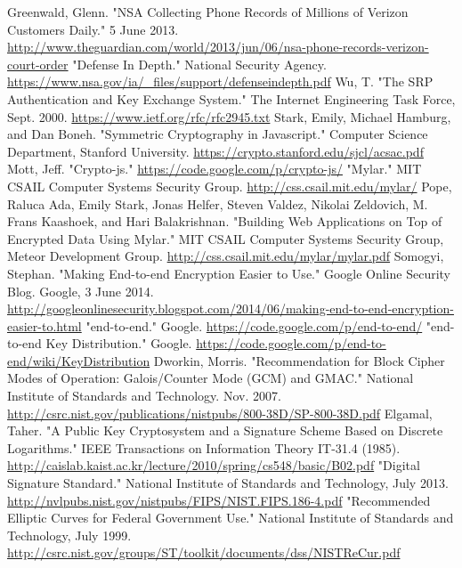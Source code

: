 \documentclass[conference]{IEEEtran}
\begin{document}
\newpage
\begin{thebibliography}{14}
 Greenwald, Glenn. "NSA Collecting Phone Records of Millions of Verizon Customers Daily." 5 June 2013. \url{http://www.theguardian.com/world/2013/jun/06/nsa-phone-records-verizon-court-order}
 "Defense In Depth." National Security Agency. \url{https://www.nsa.gov/ia/_files/support/defenseindepth.pdf}
 Wu, T. "The SRP Authentication and Key Exchange System." The Internet Engineering Task Force, Sept. 2000. \url{https://www.ietf.org/rfc/rfc2945.txt}
 Stark, Emily, Michael Hamburg, and Dan Boneh. "Symmetric Cryptography in Javascript." Computer Science Department, Stanford University. \url{https://crypto.stanford.edu/sjcl/acsac.pdf}
 Mott, Jeff. "Crypto-js." \url{https://code.google.com/p/crypto-js/}
 "Mylar." MIT CSAIL Computer Systems Security Group. \url{http://css.csail.mit.edu/mylar/}
 Pope, Raluca Ada, Emily Stark, Jonas Helfer, Steven Valdez, Nikolai Zeldovich, M. Frans Kaashoek, and Hari Balakrishnan. "Building Web Applications on Top of Encrypted Data Using Mylar." MIT CSAIL Computer Systems Security Group, Meteor Development Group. \url{http://css.csail.mit.edu/mylar/mylar.pdf}
 Somogyi, Stephan. "Making End-to-end Encryption Easier to Use." Google Online Security Blog. Google, 3 June 2014. \url{http://googleonlinesecurity.blogspot.com/2014/06/making-end-to-end-encryption-easier-to.html}
 "end-to-end." Google. \url{https://code.google.com/p/end-to-end/}
 "end-to-end Key Distribution." Google. \url{https://code.google.com/p/end-to-end/wiki/KeyDistribution}
 Dworkin, Morris. "Recommendation for Block Cipher Modes of Operation: Galois/Counter Mode (GCM) and GMAC." National Institute of Standards and Technology. Nov. 2007. \url{http://csrc.nist.gov/publications/nistpubs/800-38D/SP-800-38D.pdf}
 Elgamal, Taher. "A Public Key Cryptosystem and a Signature Scheme Based on Discrete Logarithms." IEEE Transactions on Information Theory IT-31.4 (1985). \url{http://caislab.kaist.ac.kr/lecture/2010/spring/cs548/basic/B02.pdf}
 "Digital Signature Standard." National Institute of Standards and Technology, July 2013. \url{http://nvlpubs.nist.gov/nistpubs/FIPS/NIST.FIPS.186-4.pdf}
 "Recommended Elliptic Curves for Federal Government Use." National Institute of Standards and Technology, July 1999. \url{http://csrc.nist.gov/groups/ST/toolkit/documents/dss/NISTReCur.pdf}

\end{thebibliography}
\end{document}
